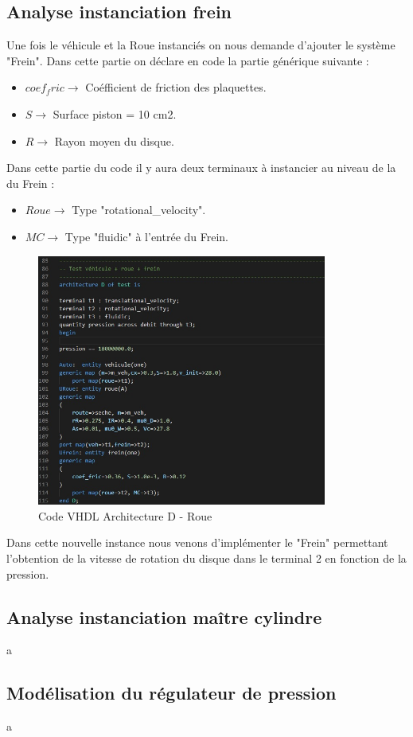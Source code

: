\subsection{Analyse instanciation frein}
Une fois le véhicule et la Roue instanciés on nous demande d'ajouter le système "Frein". Dans cette partie on déclare en code la partie générique suivante :\\
\begin{itemize}
    \item $coef_fric    \rightarrow$ Coéfficient de friction des plaquettes.
    \item $S    \rightarrow$ Surface piston = 10 cm2.
    \item $R   \rightarrow$ Rayon moyen du disque.
\end{itemize}

\newpage

Dans cette partie du code il y aura deux terminaux à instancier au niveau de la du Frein :\\
\begin{itemize}
    \item $Roue    \rightarrow$ Type "rotational\_velocity".
    \item $MC    \rightarrow$ Type "fluidic" à l'entrée du Frein.
\end{itemize}

\begin{figure}[h]
    \centering
    \includegraphics[width=0.85\textwidth]{images/Instanciation_frein.jpg}
    \caption{Code VHDL Architecture D - Roue}
\end{figure}

Dans cette nouvelle instance nous venons d'implémenter le "Frein" permettant l'obtention de la vitesse de rotation du disque dans le terminal 2 en fonction de la pression.
\subsection{Analyse instanciation maître cylindre}
a
\subsection{Modélisation du régulateur de pression}
a
\newpage